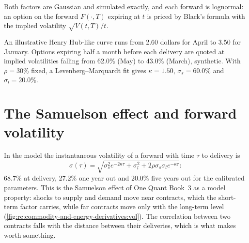 Both factors are Gaussian and simulated exactly, and each forward is lognormal: an option
on the forward $F(\cdot,T)$ expiring at $t$ is priced by Black's formula with the implied
volatility $\sqrt{V(t,T)/t}$.

\begin{example}[Calibration]\label{ex:rc:commodity-and-energy-derivatives:calib}
An illustrative Henry Hub-like curve runs from 2.60 dollars for April to 3.50 for January.
Options expiring half a month before each delivery are quoted at implied volatilities
falling from 62.0\% (May) to 43.0\% (March), synthetic. With $\rho = 30\%$ fixed, a
Levenberg--Marquardt fit gives $\kappa = 1.50$, $\sigma_s = 60.0\%$ and $\sigma_l = 20.0\%$.
\end{example}

\section{The Samuelson effect and forward volatility}

In the model the instantaneous volatility of a forward with time $\tau$ to delivery is
\[
\sigma(\tau) = \sqrt{\sigma_s^2e^{-2\kappa\tau}+\sigma_l^2+2\rho\sigma_s\sigma_le^{-\kappa\tau}}:
\]
68.7\% at delivery, 27.2\% one year
out and 20.0\% five years out for the calibrated parameters. This is the Samuelson effect
of One Quant Book~3 as a model property: shocks to supply and demand move near contracts,
which the short-term factor carries, while far contracts move only with the long-term
level (\cref{fig:rc:commodity-and-energy-derivatives:vol}). The correlation between two
contracts falls with the distance between their deliveries, which is what makes  worth something.

